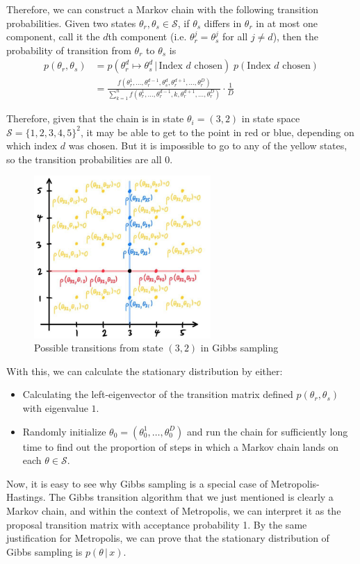   Therefore, we can construct a Markov chain with the following transition probabilities. Given two states $\theta_r, \theta_s \in \mathcal{S}$, if $\theta_s$ differs in $\theta_r$ in at most one component, call it the $d$th component (i.e. $\theta_r^j = \theta_s^j$ for all $j \neq d$), then the probability of transition from $\theta_r$ to $\theta_s$ is
  \begin{align*}
    p(\theta_r, \theta_s) & = p(\theta_r^d \mapsto \theta_{s}^d\,|\, \text{Index } d \text{ chosen})\; p (\text{Index } d \text{ chosen}) \\
    & = \frac{f(\theta_r^1, \ldots, \theta_r^{d-1}, \theta_s^d, \theta_r^{d+1}, \ldots, \theta_r^D)}{\sum_{k=1}^n f(\theta_r^1, \ldots, \theta_r^{d-1}, k, \theta_r^{d+1}, \ldots, \theta_r^D)} \cdot \frac{1}{D}
  \end{align*}

  Therefore, given that the chain is in state $\theta_i = (3, 2)$ in state space $\mathcal{S} = \{1, 2, 3, 4, 5\}^2$, it may be able to get to the point in red or blue, depending on which index $d$ was chosen. But it is impossible to go to any of the yellow states, so the transition probabilities are all $0$.

  \begin{figure}[H]
    \centering
    \includegraphics[width=0.6\textwidth]{img/prob_0.jpg}
    \caption{Possible transitions from state $(3,2)$ in Gibbs sampling}
  \end{figure}

  With this, we can calculate the stationary distribution by either:
  \begin{itemize}
    \item Calculating the left-eigenvector of the transition matrix defined $p(\theta_r, \theta_s)$ with eigenvalue $1$.
    \item Randomly initialize $\theta_0 = (\theta_0^1, \ldots, \theta_0^D)$ and run the chain for sufficiently long time to find out the proportion of steps in which a Markov chain lands on each $\theta \in \mathcal{S}$.
  \end{itemize}

  Now, it is easy to see why Gibbs sampling is a special case of Metropolis-Hastings. The Gibbs transition algorithm that we just mentioned is clearly a Markov chain, and within the context of Metropolis, we can interpret it as the proposal transition matrix with acceptance probability 1. By the same justification for Metropolis, we can prove that the stationary distribution of Gibbs sampling is $p(\theta\,|\,x)$.

